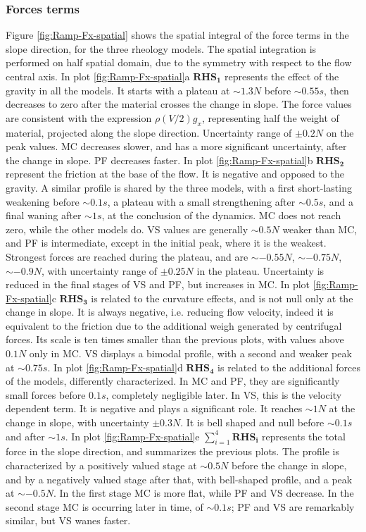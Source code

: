 \documentclass{article}
\begin{document}
\subsubsection{Forces terms}
Figure \ref{fig:Ramp-Fx-spatial} shows the spatial integral of the force terms in the slope direction, for the three rheology models. The spatial integration is performed on half spatial domain, due to the symmetry with respect to the flow central axis. In plot \ref{fig:Ramp-Fx-spatial}a $\boldsymbol{RHS_1}$ represents the effect of the gravity in all the models. It starts with a plateau at $\sim 1.3 N$ before $\sim 0.55 s$, then decreases to zero after the material crosses the change in slope. The force values are consistent with the expression $\rho \left(V/2\right) g_x$, representing half the weight of material, projected along the slope direction. Uncertainty range of $\pm 0.2 N$ on the peak values. MC decreases slower, and has a more significant uncertainty, after the change in slope. PF decreases faster. In plot \ref{fig:Ramp-Fx-spatial}b $\boldsymbol{RHS_2}$ represent the friction at the base of the flow. It is negative and opposed to the gravity. A similar profile is shared by the three models, with a first short-lasting weakening before $\sim 0.1 s$, a plateau with a small strengthening after $\sim 0.5 s$, and a final waning after $\sim 1 s$, at the conclusion of the dynamics. MC does not reach zero, while the other models do. VS values are generally $\sim 0.5 N$ weaker than MC, and PF is intermediate, except in the initial peak, where it is the weakest. Strongest forces are reached during the plateau, and are $\sim -0.55 N$, $\sim -0.75 N$, $\sim -0.9 N$, with uncertainty range of $\pm 0.25 N$ in the plateau. Uncertainty is reduced in the final stages of VS and PF, but increases in MC. In plot \ref{fig:Ramp-Fx-spatial}c $\boldsymbol{RHS_3}$ is related to the curvature effects, and is not null only at the change in slope. It is always negative, i.e. reducing flow velocity, indeed it is equivalent to the friction due to the additional weigh generated by centrifugal forces. Its scale is ten times smaller than the previous plots, with values above $0.1 N$ only in MC. VS displays a bimodal profile, with a second and weaker peak at $\sim 0.75 s$. In plot \ref{fig:Ramp-Fx-spatial}d $\boldsymbol{RHS_4}$ is related to the additional forces of the models, differently characterized. In MC and PF, they are significantly small forces before $0.1 s$, completely negligible later. In VS, this is the velocity dependent term. It is negative and plays a significant role. It reaches $\sim 1 N$ at the change in slope, with uncertainty $\pm 0.3 N$. It is bell shaped and null before $\sim 0.1 s$ and after $\sim 1 s$. In plot \ref{fig:Ramp-Fx-spatial}e $\sum^4_{i=1}\boldsymbol{RHS_i}$ represents the total force in the slope direction, and summarizes the previous plots. The profile is characterized by a positively valued stage at $\sim 0.5 N$ before the change in slope, and by a negatively valued stage after that, with bell-shaped profile, and a peak at $\sim -0.5 N$. In the first stage MC is more flat, while PF and VS decrease. In the second stage MC is occurring later in time, of $\sim 0.1 s$; PF and VS are remarkably similar, but VS wanes faster.
\end{document}
